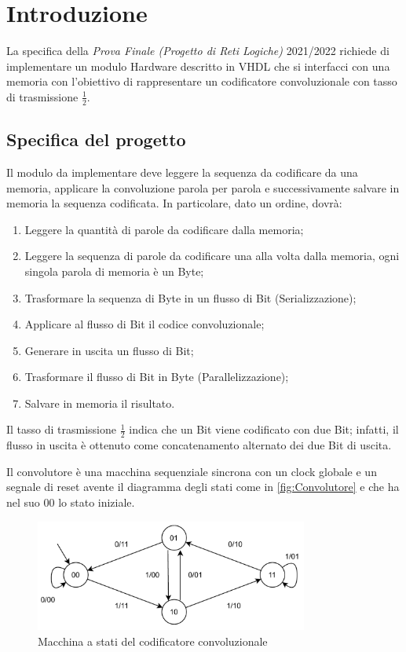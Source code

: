 \chapter{Introduzione}
La specifica della \textit{Prova Finale (Progetto di Reti Logiche)} 2021/2022 richiede di 
implementare un modulo Hardware descritto in VHDL che si interfacci con una
memoria con l'obiettivo di rappresentare un codificatore convoluzionale con tasso di trasmissione \( \frac{1}{2} \).
\section{Specifica del progetto}
Il modulo da implementare deve leggere la sequenza da codificare da una memoria, applicare la convoluzione parola per parola e 
successivamente salvare in memoria la sequenza codificata.
In particolare, dato un ordine, dovrà:
\begin{enumerate}
    \item Leggere la quantità di parole da codificare dalla memoria;
    \item Leggere la sequenza di parole da codificare una alla volta dalla memoria, ogni singola parola di memoria è un Byte;
    \item Trasformare la sequenza di Byte in un flusso di Bit (Serializzazione);
    \item Applicare al flusso di Bit il codice convoluzionale;
    \item Generare in uscita un flusso di Bit;
    \item Trasformare il flusso di Bit in Byte (Parallelizzazione);
    \item Salvare in memoria il risultato.
\end{enumerate}
Il tasso di trasmissione \( \frac{1}{2} \) indica che un Bit viene codificato con due Bit; infatti, il flusso 
in uscita è ottenuto come concatenamento alternato dei due Bit di uscita.

Il convolutore è una macchina sequenziale sincrona con un clock globale e un segnale di reset avente il diagramma 
degli stati come in \autoref{fig:Convolutore} e che ha nel suo 00 lo stato iniziale.
\begin{figure}
    \centering
    \includegraphics[width= 0.8\textwidth]{images/Capitolo1/conv.png} 
    \caption{Macchina a stati del codificatore convoluzionale} 
    \label{fig:Convolutore}
\end{figure}
\newpage
